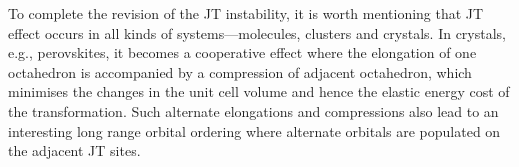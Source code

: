 \documentclass[a4paper,prb,twocolumn]{revtex4-1}  %
\newcommand{\com}[1]{}
\newcommand{\az}[1]{{\color{magenta}{#1}}} %
\begin{document}
 
To complete the revision of the JT instability,
it is worth mentioning that
JT effect occurs in all kinds of systems---molecules, clusters and crystals.
In crystals, e.g., perovskites, it becomes a cooperative effect where the
elongation of one octahedron is accompanied by a compression of adjacent octahedron,
which minimises the changes in the unit cell volume and hence the elastic energy cost of the transformation.
Such alternate elongations and compressions also lead to 
an interesting long range orbital ordering where alternate orbitals
are populated on the adjacent JT sites.
 
 
 
 





\com{
\begin{align}
E_{xy} =&
\frac{32}{7} \left[
\left(1-\frac{1}{(\delta +1)^3}\right) D_2
-
\left(1-\frac{1}{(\delta +1)^5}\right) \frac{20}{9}D_4
\right]\frac{q_o}{a},\\
E_{yz} =& E_{zx} = -3/2 E_{xy},
\end{align}
as measured from their average 
$E_0^{t_{2g}} = -64q_oD_4 \left(2+(\delta +1)^{-5}\right)/9a$.
Similarly, $e_g$ splits up as
\begin{align}
E_{x^2-y^2}=&\frac{32}{7} \left[\left(1-\frac{1}{(\delta +1)^3}\right) \text{D2}+\frac{5}{3}\left(1-\frac{1}{(\delta +1)^5}\right) \text{D4}\right]\frac{q_o}{a},\\
E_{z^2}=&-E_{x^2-y^2},
\end{align}
measured from their average 
$E_0^{e_{g}} = 32 q_oD_4 \left(2+(\delta +1)^{-5}\right)/3a$.
The crystal field splitting becomes
\begin{align}
\Delta \equiv E_0^{e_{g}}-E_0^{t_{2g}}=\frac{160}{9} \left(\frac{1}{(\delta +1)^5}+2\right) D_4.
\end{align}
}
\end{document}
